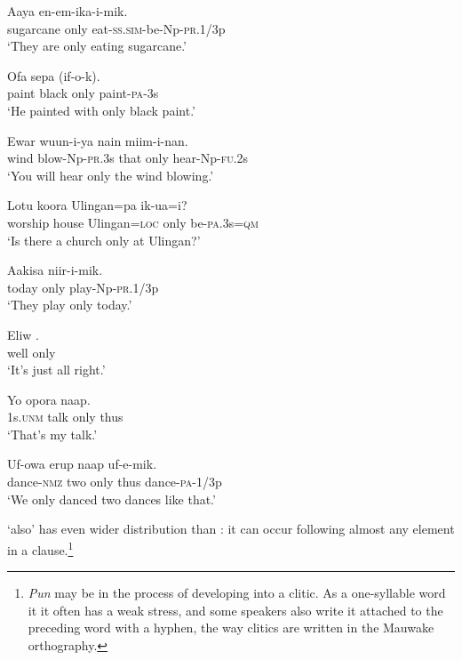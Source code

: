 \ea%
\label{ex:3:x747}
\gll Aaya  en-em-ika-i-mik. \\
sugarcane only eat-\textsc{ss}.\textsc{sim}-be-Np-\textsc{pr}.1/3p\\
\glt`They are only eating sugarcane.' 
\z

\ea%
\label{ex:3:x748}
\gll Ofa sepa   (if-o-k). \\
paint black only paint-\textsc{pa}-3s\\
\glt`He painted with only black paint.'
\z

\ea%
\label{ex:3:x757}
\gll Ewar wuun-i-ya nain  miim-i-nan. \\
wind blow-Np-\textsc{pr}.3s that only hear-Np-\textsc{fu}.2s\\
\glt`You will hear only the wind blowing.'
\z

\ea%
\label{ex:3:x758}
\gll Lotu koora Ulingan=pa  ik-ua=i? \\
worship house Ulingan=\textsc{loc} only be-\textsc{pa}.3s=\textsc{qm}\\
\glt`Is there a church only at Ulingan?'
\z

\ea%
\label{ex:3:x806}
\gll Aakisa  niir-i-mik. \\
today only play-Np-\textsc{pr}.1/3p\\
\glt`They play only today.'
\z

\ea%
\label{ex:3:x807}
\gll Eliw . \\
well only\\
\glt`It's just all right.'
\z

\ea%
\label{ex:3:x1820}
\gll Yo opora  naap. \\
1s.\textsc{unm} talk only thus\\
\glt`That's my talk.'
\z

\ea%
\label{ex:3:x1821}
\gll Uf-owa erup  naap uf-e-mik. \\
dance-\textsc{nmz} two only thus dance-\textsc{pa}-1/3p\\
\glt`We only danced two dances like that.'
\z

 `also' has even wider distribution than : it can occur following almost any element in a clause.\footnote{\textit{Pun} may be in the process of developing into a clitic. As a one-syllable word it it often has a weak stress, and some speakers also write it attached to the preceding word with a hyphen, the way clitics are written in the Mauwake orthography.} 

